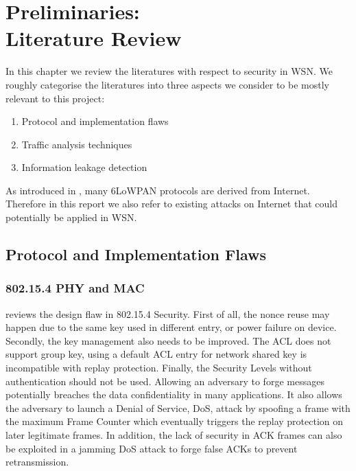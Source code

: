 \chapter{Preliminaries:\\ Literature Review} \label{Chp: LiteratureReview}

In this chapter we review the literatures with respect to security in WSN. We roughly categorise the literatures into three aspects we consider to be mostly relevant to this project:

\begin{enumerate}
	\item Protocol and implementation flaws
	\item Traffic analysis techniques
	\item Information leakage detection
\end{enumerate}

As introduced in , many 6LoWPAN protocols are derived from Internet. Therefore in this report we also refer to existing attacks on Internet that could potentially be applied in WSN.

\section{Protocol and Implementation Flaws}


\subsection{802.15.4 PHY and MAC}
\cite{802154sec} reviews the design flaw in 802.15.4 Security. First of all, the nonce reuse may happen due to the same key used in different entry, or power failure on device. Secondly, the key management also needs to be improved. The ACL does not support group key, using a default ACL entry for network shared key is incompatible with replay protection. Finally, the Security Levels without authentication should not be used. Allowing an adversary to forge messages potentially breaches the data confidentiality in many applications. It also allows the adversary to launch a Denial of Service, DoS, attack by spoofing a frame with the maximum Frame Counter which eventually triggers the replay protection on later legitimate frames. In addition, the lack of security in ACK frames can also be exploited in a jamming DoS attack to forge false ACKs to prevent retransmission.

